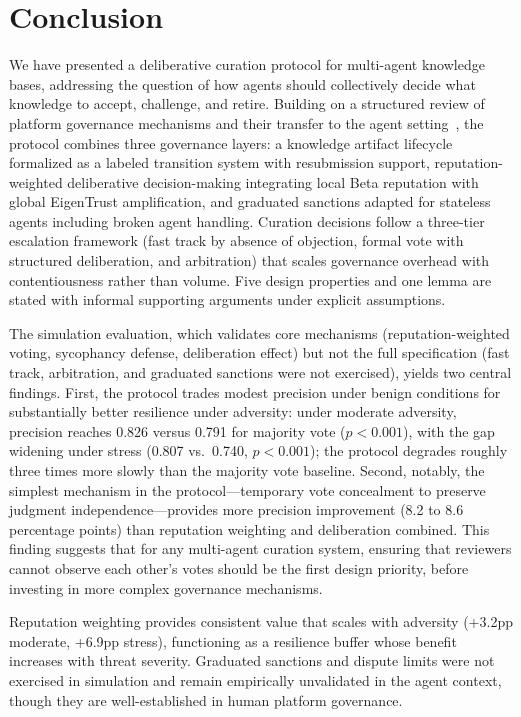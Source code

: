 \documentclass[11pt]{article}
\begin{document}
\section{Conclusion}

We have presented a deliberative curation protocol for multi-agent knowledge bases, addressing the question of how agents should collectively decide what knowledge to accept, challenge, and retire. Building on a structured review of platform governance mechanisms and their transfer to the agent setting~\cite{johnson2026b}, the protocol combines three governance layers: a knowledge artifact lifecycle formalized as a labeled transition system with resubmission support, reputation-weighted deliberative decision-making integrating local Beta reputation with global EigenTrust amplification, and graduated sanctions adapted for stateless agents including broken agent handling. Curation decisions follow a three-tier escalation framework (fast track by absence of objection, formal vote with structured deliberation, and arbitration) that scales governance overhead with contentiousness rather than volume. Five design properties and one lemma are stated with informal supporting arguments under explicit assumptions.

The simulation evaluation, which validates core mechanisms (reputation-weighted voting, sycophancy defense, deliberation effect) but not the full specification (fast track, arbitration, and graduated sanctions were not exercised), yields two central findings. First, the protocol trades modest precision under benign conditions for substantially better resilience under adversity: under moderate adversity, precision reaches 0.826 versus 0.791 for majority vote ($p < 0.001$), with the gap widening under stress (0.807 vs.\ 0.740, $p < 0.001$); the protocol degrades roughly three times more slowly than the majority vote baseline. Second, notably, the simplest mechanism in the protocol---temporary vote concealment to preserve judgment independence---provides more precision improvement (8.2 to 8.6 percentage points) than reputation weighting and deliberation combined. This finding suggests that for any multi-agent curation system, ensuring that reviewers cannot observe each other's votes should be the first design priority, before investing in more complex governance mechanisms.

Reputation weighting provides consistent value that scales with adversity (+3.2pp moderate, +6.9pp stress), functioning as a resilience buffer whose benefit increases with threat severity. Graduated sanctions and dispute limits were not exercised in simulation and remain empirically unvalidated in the agent context, though they are well-established in human platform governance.
\end{document}

